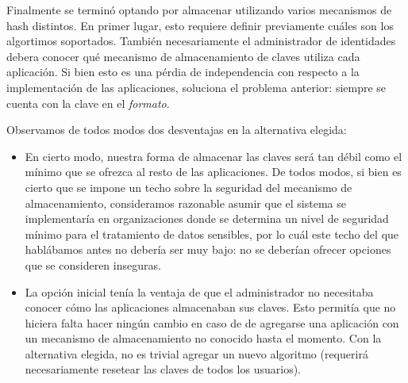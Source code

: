Finalmente se terminó optando por almacenar utilizando varios mecanismos de hash distintos. En primer lugar,
esto requiere definir previamente cuáles son los algortimos soportados. También necesariamente el administrador
de identidades debera conocer qué mecanismo de almacenamiento de claves utiliza cada aplicación. Si bien esto
es una pérdia de independencia con respecto a la implementación de las aplicaciones, soluciona el problema 
anterior: siempre se cuenta con la clave en el \textit{formato}.

Observamos de todos modos dos desventajas en la alternativa elegida:
\begin{itemize}
 \item  En cierto modo, nuestra forma de almacenar las claves será tan débil como el mínimo que se ofrezca al
 		resto de las aplicaciones. De todos modos, si bien es cierto que se impone un techo sobre la seguridad
 		del mecanismo de almacenamiento, consideramos razonable asumir que el sistema se implementaría en
 		organizaciones donde se determina un nivel de seguridad mínimo para el tratamiento de datos sensibles,
 		por lo cuál este techo del que hablábamos antes no debería ser muy bajo: no se deberían ofrecer opciones
 		que se consideren inseguras.
 \item  La opción inicial tenía la ventaja de que el administrador no necesitaba conocer cómo las aplicaciones
 		almacenaban sus claves. Esto permitía que no hiciera falta hacer ningún cambio en caso de de agregarse
 		una aplicación con un mecanismo de almacenamiento no conocido hasta el momento. Con la alternativa
 		elegida, no es trivial agregar un nuevo algoritmo (requerirá necesariamente resetear las claves de
 		todos los usuarios).
\end{itemize}